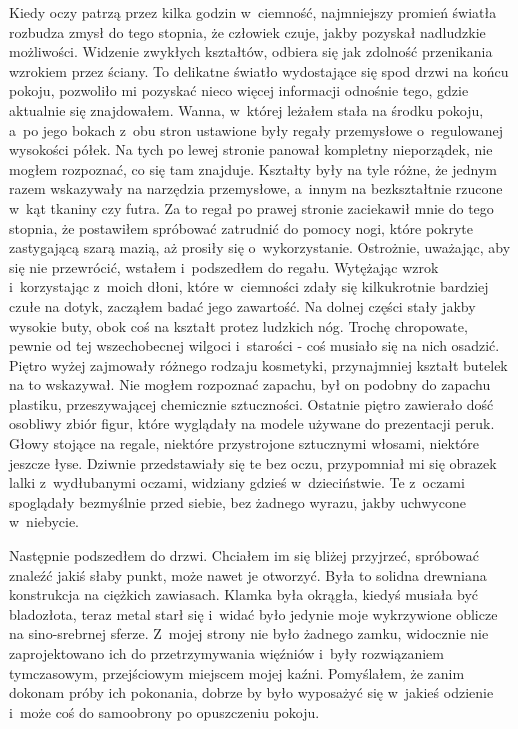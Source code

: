 Kiedy oczy patrzą przez kilka godzin w~ciemność, najmniejszy promień światła rozbudza zmysł do tego stopnia, że człowiek czuje, jakby pozyskał nadludzkie możliwości. Widzenie zwykłych kształtów, odbiera się jak zdolność przenikania wzrokiem przez ściany. To delikatne światło wydostające się spod drzwi na końcu pokoju, pozwoliło mi pozyskać nieco więcej informacji odnośnie tego, gdzie aktualnie się znajdowałem. Wanna, w~której leżałem stała na środku pokoju, a~po jego bokach z~obu stron ustawione były regały przemysłowe o~regulowanej wysokości półek. Na tych po lewej stronie panował kompletny nieporządek, nie mogłem rozpoznać, co się tam znajduje. Kształty były na tyle różne, że jednym razem wskazywały na narzędzia przemysłowe, a~innym na bezkształtnie rzucone w~kąt tkaniny czy futra. Za to regał po prawej stronie zaciekawił mnie do tego stopnia, że postawiłem spróbować zatrudnić do pomocy nogi, które pokryte zastygającą szarą mazią, aż prosiły się o~wykorzystanie. Ostrożnie, uważając, aby się nie przewrócić, wstałem i~podszedłem do regału. Wytężając wzrok i~korzystając z~moich dłoni, które w~ciemności zdały się kilkukrotnie bardziej czułe na dotyk, zacząłem badać jego zawartość. Na dolnej części stały jakby wysokie buty, obok coś na kształt protez ludzkich nóg. Trochę chropowate, pewnie od tej wszechobecnej wilgoci i~starości - coś musiało się na nich osadzić. Piętro wyżej zajmowały różnego rodzaju kosmetyki, przynajmniej kształt butelek na to wskazywał. Nie mogłem rozpoznać zapachu, był on podobny do zapachu plastiku, przeszywającej chemicznie sztuczności. Ostatnie piętro zawierało dość osobliwy zbiór figur, które wyglądały na modele używane do prezentacji peruk. Głowy stojące na regale, niektóre przystrojone sztucznymi włosami, niektóre jeszcze łyse. Dziwnie przedstawiały się te bez oczu, przypomniał mi się obrazek lalki z~wydłubanymi oczami, widziany gdzieś w~dzieciństwie. Te z~oczami spoglądały bezmyślnie przed siebie, bez żadnego wyrazu, jakby uchwycone w~niebycie. 

Następnie podszedłem do drzwi. Chciałem im się bliżej przyjrzeć, spróbować znaleźć jakiś słaby punkt, może nawet je otworzyć. Była to solidna drewniana konstrukcja na ciężkich zawiasach. Klamka była okrągła, kiedyś musiała być bladozłota, teraz metal starł się i~widać było jedynie moje wykrzywione oblicze na sino-srebrnej sferze. Z~mojej strony nie było żadnego zamku, widocznie nie zaprojektowano ich do przetrzymywania więźniów i~były rozwiązaniem tymczasowym, przejściowym miejscem mojej kaźni. Pomyślałem, że zanim dokonam próby ich pokonania, dobrze by było wyposażyć się w~jakieś odzienie i~może coś do samoobrony po opuszczeniu pokoju.

